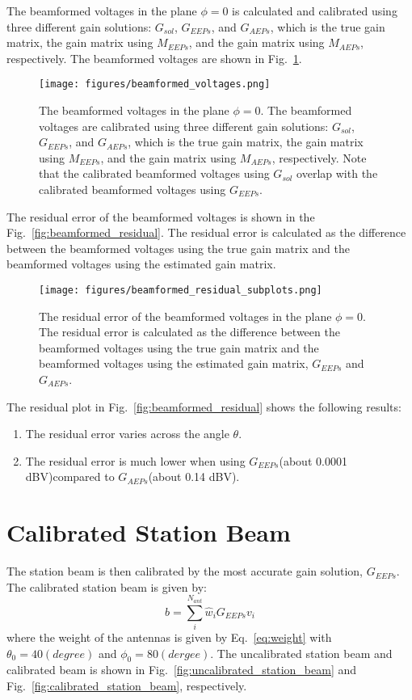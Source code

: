 \documentclass[10pt,a4paper,twocolumn]{article}
\begin{document}
The beamformed voltages in the plane $\phi =0$ is calculated and calibrated using three different gain solutions: $G_{sol}$, $G_{EEPs}$, and $G_{AEPs}$, which is the true gain matrix, the gain matrix using $M_{EEPs}$, and the gain matrix using $M_{AEPs}$, respectively.
The beamformed voltages are shown in Fig.~\ref{fig:beamformed_voltages}.
\begin{figure}[H]
    \centering
    \texttt{[image: figures/beamformed\_voltages.png]}
    \caption{The beamformed voltages in the plane $\phi = 0$. The beamformed voltages are calibrated using three different gain solutions: $G_{sol}$, $G_{EEPs}$, and $G_{AEPs}$, which is the true gain matrix, the gain matrix using $M_{EEPs}$, and the gain matrix using $M_{AEPs}$, respectively. Note that the calibrated beamformed voltages using $G_{sol}$ overlap with the calibrated beamformed voltages using $G_{EEPs}$.}
    \label{fig:beamformed_voltages}
\end{figure}

The residual error of the beamformed voltages is shown in the Fig.~\ref{fig:beamformed_residual}. The residual error is calculated as the difference between the beamformed voltages using the true gain matrix and the beamformed voltages using the estimated gain matrix. 

\begin{figure}[H]
    \centering
    \texttt{[image: figures/beamformed\_residual\_subplots.png]}
    \caption{The residual error of the beamformed voltages in the plane $\phi = 0$. The residual error is calculated as the difference between the beamformed voltages using the true gain matrix and the beamformed voltages using the estimated gain matrix, $G_{EEPs}$ and $G_{AEPs}$.}
    \label{fig:beamformed_residual_subplots}
\end{figure}

The residual plot in Fig.~\ref{fig:beamformed_residual} shows the following results:

\begin{enumerate}
    \item The residual error varies across the angle $\theta$. 
    \item The residual error is much lower when using $G_{EEPs}$(about 0.0001 dBV)compared to $G_{AEPs}$(about 0.14 dBV).
\end{enumerate}

\section{Calibrated Station Beam}
The station beam is then calibrated by the most accurate gain solution, $G_{EEPs}$. The calibrated station beam is given by:
\begin{equation}
    b = \sum_{i}^{N_{ant}} \hat{w}_i G_{EEPs} v_i
    \label{eq:station_beam}
\end{equation}
where the weight of the antennas is given by Eq.~\ref{eq:weight} with $\theta_0 = 40(degree)$ and $\phi_0 = 80(dergee)$. The uncalibrated station beam and calibrated beam is shown in Fig.~\ref{fig:uncalibrated_station_beam} and Fig.~\ref{fig:calibrated_station_beam}, respectively.
\end{document}
